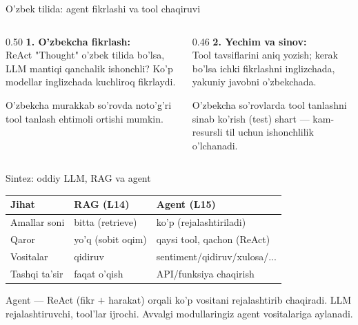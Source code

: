 \documentclass[aspectratio=169,11pt]{beamer}
\begin{document}
\begin{frame}{O'zbek tilida: agent fikrlashi va tool chaqiruvi}
  \begin{columns}[T]
    \begin{column}{0.50\textwidth}
      \textbf{1. O'zbekcha fikrlash:}\\[3pt]
      \small
      ReAct "Thought" o'zbek tilida bo'lsa, LLM mantiqi qanchalik ishonchli?
      Ko'p modellar inglizchada kuchliroq fikrlaydi.
      \begin{tcolorbox}[warnbox,title=Xavf,top=2pt,bottom=2pt]
        \footnotesize
        O'zbekcha murakkab so'rovda noto'g'ri tool tanlash ehtimoli ortishi mumkin.
      \end{tcolorbox}
    \end{column}
    \begin{column}{0.46\textwidth}
      \textbf{2. Yechim va sinov:}\\[3pt]
      \small
      Tool tavsiflarini aniq yozish; kerak bo'lsa ichki fikrlashni inglizchada,
      yakuniy javobni o'zbekchada.
      \begin{tcolorbox}[okbox,top=2pt,bottom=2pt]
        \footnotesize
        O'zbekcha so'rovlarda tool tanlashni sinab ko'rish (test) shart ---
        kam-resursli til uchun ishonchlilik o'lchanadi.
      \end{tcolorbox}
    \end{column}
  \end{columns}
\end{frame}

\begin{frame}{Sintez: oddiy LLM, RAG va agent}
  \begin{center}\small
  \begin{tabular}{p{3.0cm}p{3.2cm}p{4.4cm}}
    \toprule
    \textbf{Jihat} & \textbf{RAG (L14)} & \textbf{Agent (L15)} \\
    \midrule
    Amallar soni & bitta (retrieve) & ko'p (rejalashtiriladi) \\
    Qaror & yo'q (sobit oqim) & qaysi tool, qachon (ReAct) \\
    Vositalar & qidiruv & sentiment/qidiruv/xulosa/... \\
    Tashqi ta'sir & faqat o'qish & API/funksiya chaqirish \\
    \bottomrule
  \end{tabular}
  \end{center}
  \vspace{4pt}
  \begin{tcolorbox}[okbox,title=Asosiy g'oya,top=2pt,bottom=2pt]
    \footnotesize
    Agent --- ReAct (fikr $+$ harakat) orqali ko'p vositani rejalashtirib
    chaqiradi. LLM rejalashtiruvchi, tool'lar ijrochi. Avvalgi modullaringiz
    agent vositalariga aylanadi.
  \end{tcolorbox}
\end{frame}
\end{document}
